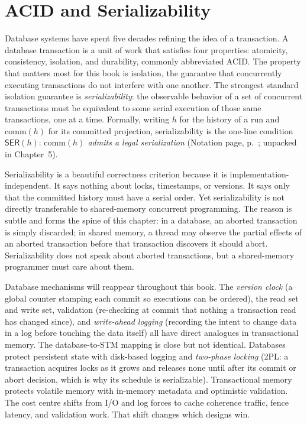 \section{ACID and Serializability}

Database systems have spent five decades refining the idea of a transaction.
A database transaction is a unit of work that satisfies four properties:
atomicity, consistency, isolation, and durability, commonly abbreviated ACID.
The property that matters most for this book is isolation, the guarantee that
concurrently executing transactions do not interfere with one another. The
strongest standard isolation guarantee is \emph{serializability}: the
observable behavior of a set of concurrent transactions must be equivalent to
some serial execution of those same transactions, one at a time.
Formally, writing $h$ for the history of a run and
$\mathrm{comm}(h)$ for its committed projection, serializability is the
one-line condition $\mathsf{SER}(h)$: \emph{$\mathrm{comm}(h)$ admits a
legal serialization} (Notation page, p.~\pageref{cha:notation}; unpacked
in Chapter~5).

Serializability is a beautiful correctness criterion because it is
implementation-independent. It says nothing about locks, timestamps, or
versions. It says only that the committed history must have a serial order.
Yet serializability is not directly transferable to shared-memory concurrent
programming. The reason is subtle and forms the spine of this chapter: in a
database, an aborted transaction is simply discarded; in shared memory, a
thread may observe the partial effects of an aborted transaction before that
transaction discovers it should abort. Serializability does not speak about
aborted transactions, but a shared-memory programmer must care about them.

Database mechanisms will reappear throughout this book. The \emph{version
clock} (a global counter stamping each commit so executions can be ordered),
the read set and write set, validation (re-checking at commit that nothing a
transaction read has changed since), and \emph{write-ahead logging} (recording
the intent to change data in a log before touching the data itself) all have
direct analogues in transactional memory. The database-to-STM mapping is close
but not identical. Databases protect persistent state with disk-based logging
and \emph{two-phase locking} (2PL: a transaction acquires locks as it grows
and releases none until after its commit or abort decision, which is why its
schedule is serializable). Transactional memory protects volatile memory with in-memory
metadata and optimistic validation. The cost centre shifts from I/O and log
forces to cache coherence traffic, fence latency, and validation work. That
shift changes which designs win.

